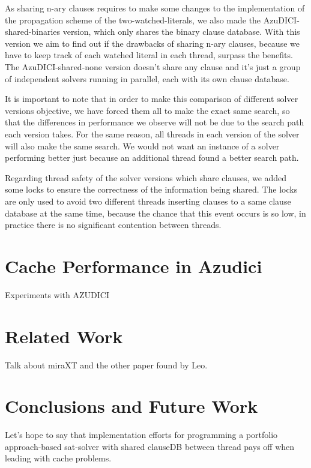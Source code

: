 \documentclass{llncs}
\begin{document}
As sharing n-ary clauses requires to make some changes to the
implementation of the propagation scheme of the two-watched-literals,
we also made the AzuDICI-shared-binaries version, which only shares
the binary clause database. With this version we aim to find out
if the drawbacks of sharing n-ary clauses, because we have to keep
track of each watched literal in each thread, surpass the benefits.
The AzuDICI-shared-none version doesn't share any clause and it's
just a group of independent solvers running in parallel, each with
its own clause database.

It is important to note that in order to make this comparison of
different solver versions objective, we have forced them all to make
the exact same search, so that the differences in performance we
observe will not be due to the search path each version takes.
For the same reason, all threads in each version of the solver will
also make the same search. We would not want an instance of a
solver performing better just because an additional thread found
a better search path.

Regarding thread safety of the solver versions which share clauses,
we added some locks to ensure the correctness of the information
being shared. The locks are only used to avoid two different threads
inserting clauses to a same clause database at the same time,
because the chance that this event occurs is so low, in practice
there is no significant contention between threads.


\section{Cache Performance in Azudici}

Experiments with AZUDICI

\section{Related Work}

Talk about miraXT and the other paper found by Leo.

\section{Conclusions and Future Work}

Let's hope to say that implementation efforts for programming a
portfolio approach-based sat-solver with shared clauseDB between
thread pays off when leading with cache problems.
\end{document}
